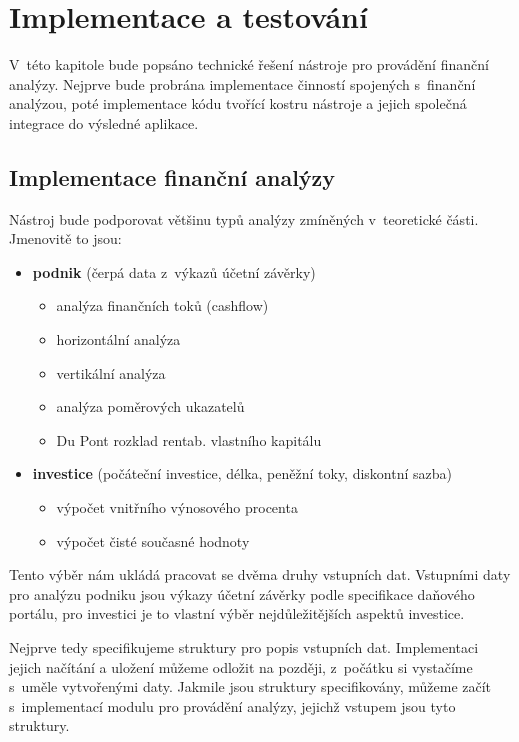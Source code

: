 \chapter{Implementace a testování}

V~této kapitole bude popsáno technické řešení nástroje pro provádění finanční analýzy. Nejprve bude probrána implementace činností spojených s~finanční analýzou, poté implementace kódu tvořící kostru nástroje a jejich společná integrace do výsledné aplikace.

\section{Implementace finanční analýzy}
Nástroj bude podporovat většinu typů analýzy zmíněných v~teoretické části. Jmenovitě to jsou: 

\begin{itemize}
  \item \textbf{podnik} (čerpá data z~výkazů účetní závěrky)
  \begin{itemize}
    \item analýza finančních toků (cashflow)
    \item horizontální analýza
    \item vertikální analýza
    \item analýza poměrových ukazatelů
    \item Du Pont rozklad rentab. vlastního kapitálu 
  \end{itemize}
  \item \textbf{investice} (počáteční investice, délka, peněžní toky, diskontní sazba)
  \begin{itemize}
    \item výpočet vnitřního výnosového procenta
    \item výpočet čisté současné hodnoty
  \end{itemize}
\end{itemize}

Tento výběr nám ukládá pracovat se dvěma druhy vstupních dat. Vstupními daty pro analýzu podniku jsou výkazy účetní závěrky podle specifikace daňového portálu, pro investici je to vlastní výběr nejdůležitějších aspektů investice. 

Nejprve tedy specifikujeme struktury pro popis vstupních dat. Implementaci jejich načítání a uložení můžeme odložit na později, z~počátku si vystačíme s~uměle vytvořenými daty. Jakmile jsou struktury specifikovány, můžeme začít s~implementací modulu pro provádění analýzy, jejichž vstupem jsou tyto struktury.

